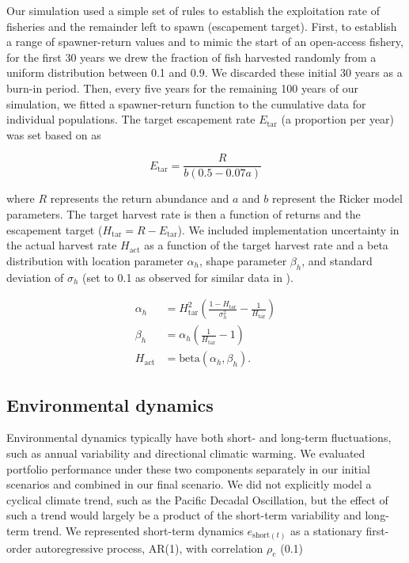 \documentclass[12pt,english]{article}
\begin{document}
\begin{spacing}{1.9}
Our simulation used a simple set of rules to establish the exploitation rate of fisheries and the remainder left to spawn (escapement target). First, to establish a range of spawner-return values and to mimic the start of an open-access fishery, for the first 30 years we drew the fraction of fish harvested randomly from a uniform distribution between 0.1 and 0.9. We discarded these initial 30 years as a burn-in period. Then, every five years for the remaining 100 years of our simulation, we fitted a spawner-return function to the cumulative data for individual populations. The target escapement rate $E_{\mathrm{tar}}$ (a proportion per year) was set based on \citet{hilborn1992} as

\[E_{\mathrm{tar}} = \frac{R}{b (0.5 - 0.07a)} \label{eq:esc}\]

\noindent
where $R$ represents the return abundance and $a$ and $b$ represent the Ricker model parameters. The target harvest rate is then a function of returns and the escapement target ($H_{\mathrm{tar}} = R - E_{\mathrm{tar}}$). We included implementation uncertainty in the actual harvest rate $H_{\mathrm{act}}$ as a function of the target harvest rate and a beta distribution with location parameter $\alpha_h$, shape parameter $\beta_h$, and standard deviation of $\sigma_h$ (set to 0.1 as observed for similar data in \citet{pestes2008}).

\[\begin{aligned}
\alpha_h &= H_{\mathrm{tar}}^2 \left( \frac{1 -
H_{\mathrm{tar}}}{\sigma_h^2} - \frac{1}{H_{\mathrm{tar}}} \right)\\ \beta_h
&= \alpha_h \left({\frac{1}{H_{\mathrm{tar}}} - 1}\right)\\
H_{\mathrm{act}} &= \mathrm{beta}(\alpha_h, \beta_h).
\end{aligned}\]

\subsection{Environmental dynamics}\label{environmental-dynamics}

Environmental dynamics typically have both short- and long-term fluctuations, such as annual variability and directional climatic warming. We evaluated portfolio performance under these two components separately in our initial scenarios and combined in our final scenario. We did not explicitly model a cyclical climate trend, such as the Pacific Decadal Oscillation, but the effect of such a trend would largely be a product of the short-term variability and long-term trend. We represented short-term dynamics $e_{\mathrm{short}(t)}$ as a stationary first-order autoregressive process, AR(1), with correlation $\rho_e$ (0.1)


\end{spacing}
\end{document}
